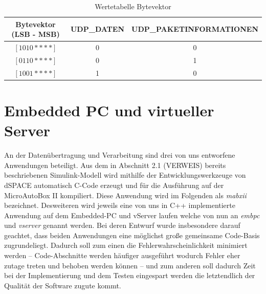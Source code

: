 \documentclass[fontsize = 12pt, paper = a4]{scrreprt}
\begin{document}
\begin{table}[h]
\centering

\caption{Wertetabelle Bytevektor}

 \begin{tabular}{ c | c | c }
 
 \toprule[1.5pt]
 Bytevektor (LSB - MSB) & UDP\_DATEN   &  UDP\_PAKETINFORMATIONEN  \\
 \midrule
  $[1 0 1 0 * * * *]$ & 0 & 0     \\
\midrule  
  $[0 1 1 0 * * * *]$ & 0 & 1     \\
\midrule  
  $[1 0 0 1 * * * *]$ & 1 & 0     \\

 
 \bottomrule[1.5pt] 
 
\end{tabular}

\end{table}

\newpage

    

   


 









  
 



   


\section{Embedded PC und virtueller Server}

An der Datenübertragung und Verarbeitung sind drei von uns entworfene Anwendungen beteiligt. Aus dem in Abschnitt 2.1 (VERWEIS) bereits beschriebenen Simulink-Modell wird mithilfe der Entwicklungswerkzeuge von dSPACE automatisch C-Code erzeugt und für die Ausführung auf der MicroAutoBox II kompiliert. Diese Anwendung wird im Folgenden als \textit{mabxii} bezeichnet. Desweiteren wird jeweils eine von uns in C++ implementierte Anwendung auf dem Embedded-PC und vServer laufen welche von nun an \textit{embpc} und \textit{vserver} genannt werden. Bei deren Entwurf wurde insbesondere darauf geachtet, dass beiden Anwendungen eine möglichst große gemeinsame Code-Basis zugrundeliegt. Dadurch soll zum einen die Fehlerwahrscheinlichkeit minimiert werden -- Code-Abschnitte werden häufiger ausgeführt wodurch Fehler eher zutage treten und behoben werden können -- und zum anderen soll dadurch Zeit bei der Implementierung und dem Testen eingespart werden die letztendlich der Qualität der Software zugute kommt. 
\end{document}
